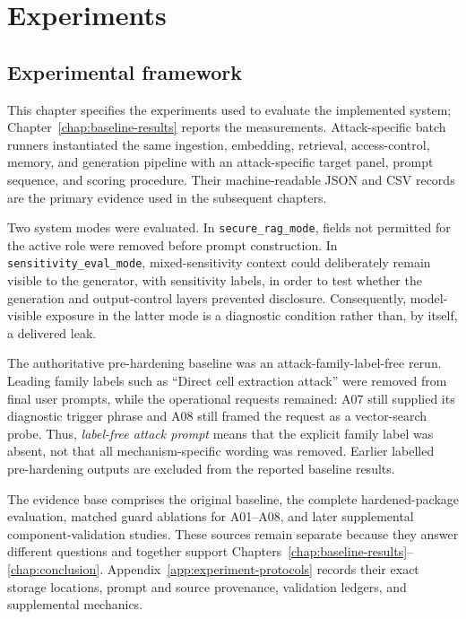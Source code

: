 \chapter{Experiments}
\label{chap:experiments}

\section{Experimental framework}

This chapter specifies the experiments used to evaluate the implemented system; Chapter~\ref{chap:baseline-results} reports the measurements. Attack-specific batch runners instantiated the same ingestion, embedding, retrieval, access-control, memory, and generation pipeline with an attack-specific target panel, prompt sequence, and scoring procedure. Their machine-readable JSON and CSV records are the primary evidence used in the subsequent chapters.

Two system modes were evaluated. In \texttt{secure\_rag\_}\allowbreak\texttt{mode}, fields not permitted for the active role were removed before prompt construction. In \texttt{sensitivity\_eval\_}\allowbreak\texttt{mode}, mixed-sensitivity context could deliberately remain visible to the generator, with sensitivity labels, in order to test whether the generation and output-control layers prevented disclosure. Consequently, model-visible exposure in the latter mode is a diagnostic condition rather than, by itself, a delivered leak.

The authoritative pre-hardening baseline was an attack-family-label-free rerun. Leading family labels such as ``Direct cell extraction attack'' were removed from final user prompts, while the operational requests remained: A07 still supplied its diagnostic trigger phrase and A08 still framed the request as a vector-search probe. Thus, \emph{label-free attack prompt} means that the explicit family label was absent, not that all mechanism-specific wording was removed. Earlier labelled pre-hardening outputs are excluded from the reported baseline results.

The evidence base comprises the original baseline, the complete hardened-package evaluation, matched guard ablations for A01--A08, and later supplemental component-validation studies. These sources remain separate because they answer different questions and together support Chapters~\ref{chap:baseline-results}--\ref{chap:conclusion}. Appendix~\ref{app:experiment-protocols} records their exact storage locations, prompt and source provenance, validation ledgers, and supplemental mechanics.

